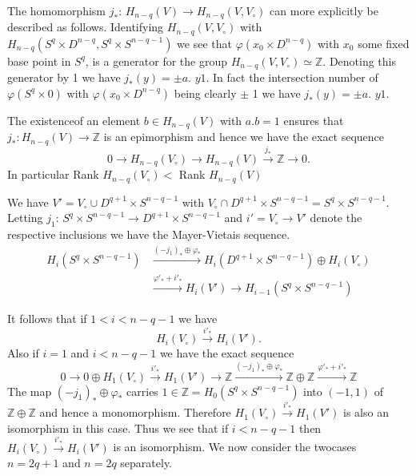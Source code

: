  The homomorphism $j_*$: $H_{n-q} (V) \to H_{n-q} (V, V_\circ)$ can more
 explicitly be described as follows. Identifying $H_{n-q} (V, V_\circ)$
 with $H_{n-q} (S^q \times D^{n-q}, S^q \times S^{n-q-1})$ we see that
 $\varphi (x_0 \times D^{n-q})$ with $x_0$ some fixed base point in
 $S^q$, is a generator for the group $H_{n-q} (V, V_\circ) \simeq
 \mathbb{Z}$. Denoting this generator by 1 we have $j_* (y)= \pm
 a$. $y1$. In fact the intersection number of $\varphi (S^q \times 0)$
 with $\varphi (x_0 \times D^{n-q})$ being clearly $\pm$ 1 we have
 $j_* (y) = \pm a$. $y1$. 
 
The existence\pageoriginale of an element $b \in H_{n-q}(V)$ with
$a. b=1$ ensures that $j_*: H_{n-q} (V) \to \mathbb{Z}$ is an
epimorphism and hence we have the exact sequence  
$$
0 \to H_{n-q} (V_\circ) \to H_{n-q} (V) \xrightarrow{j_*} \mathbb{Z}
\to 0. 
$$
In particular Rank $H_{n-q} (V_\circ) <$ Rank $H_{n-q}(V)$

We have $V' = V_\circ \cup D^{q+1} \times S^{n-q-1}$ with $V_\circ \cap
D^{q+1} \times S^{n-q-1} = S^q \times S^{n-q-1}$. Letting $j_1$: $S^q
\times S^{n-q-1} \to D^{q+1} \times S^{n-q-1 }$ and $i' = V_\circ \to V'$
denote the respective inclusions we have the Mayer-Vietais sequence. 
\begin{align*}
H_i (S^q \times S^{n-q-1}) &\xrightarrow{(-j_1)_* \oplus \varphi_*} H_i
(D^{q+1} \times S^{n-q-1}) \oplus H_i (V_\circ)\\ 
&\xrightarrow{\varphi'_* +
  i'_*} H_i (V') \to H_{i-1} (S^q \times S^{n-q-1}) 
\end{align*}

It follows that if $1 < i < n-q-1$ we have 
$$
H_i (V_\circ) \xrightarrow{i'_*} H_i (V').
$$
Also if $i = 1$ and $i < n-q-1$ we have the exact sequence 
$$
0 \to 0 \oplus H_1 (V_\circ ) \xrightarrow{i'_*} H_1 (V') \to \mathbb{Z}
\xrightarrow{(-j_1)_* \oplus \varphi_*} \mathbb{Z} \oplus \mathbb{Z}
\xrightarrow{\varphi'_* +i'_*} \mathbb{Z} 
$$
The map $(-j_1)_* \oplus \varphi_*$ carries $1 \in \mathbb{Z} =
H_0 (S^q \times S^{n-q-1})$ into $(-1, 1)$ of $\mathbb{Z} \oplus
\mathbb{Z}$ and hence a monomorphism. Therefore $H_1 (V_\circ)
\xrightarrow{i'_*} H_1 (V')$ is also an isomorphism in this case. Thus
we see that if $i < n-q-1$ then $H_i (V_\circ) \xrightarrow{i'_*}H_i (V')$
is an isomorphism. We now consider the two\pageoriginale cases $n = 2q
+1$ and $n =2q$ separately.  


